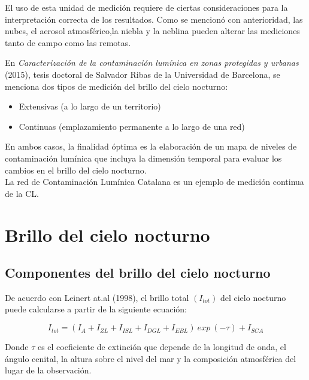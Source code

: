 El uso de esta unidad de medición requiere de ciertas consideraciones para la interpretación correcta de los resultados. Como se mencionó con anterioridad, las nubes, el aerosol atmosférico,la niebla y la neblina pueden alterar las mediciones tanto de campo como las remotas.



En \textit{Caracterización de la contaminación lumínica en zonas protegidas y urbanas} (2015), tesis doctoral de Salvador Ribas de la Universidad de Barcelona, se menciona dos tipos de medición del brillo del cielo nocturno:

\begin{itemize}

    \item Extensivas (a lo largo de un territorio)
    \item Continuas (emplazamiento permanente a lo largo de una red)     
    
\end{itemize}

En ambos casos, la finalidad óptima es la elaboración de un mapa de niveles de contaminación lumínica que incluya la dimensión temporal para evaluar los cambios en el brillo del cielo nocturno.\\

La red de Contaminación Lumínica Catalana es un ejemplo de medición continua de la CL.


\section{Brillo del cielo nocturno}

\subsection{Componentes del brillo del cielo nocturno}

De acuerdo con Leinert at.al (1998), el brillo total $(I_{tot})$ del cielo nocturno puede calcularse a partir de la siguiente ecuación:

\begin{equation}\label{eq:ej}
I_{tot}=(I_A + I_{ZL} + I_{ISL} + I_{DGL} + I_{EBL})\ exp \ (-\tau) + I_{SCA}
\end{equation}

Donde $\tau$ es el coeficiente de extinción que depende de la longitud de onda, el ángulo cenital, la altura sobre el nivel del mar y la composición atmosférica del lugar de la observación.


